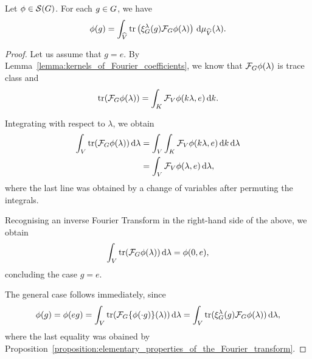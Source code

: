 \begin{proposition}
\label{proposition:inverse_Fourier_Transform}
    Let $\phi \in \Schwartz{\Group}$.
    For each $g \in \Group$,
    we have
    \begin{align*}
        \phi(g)
        = \int_\dualGroup{\VectorSpace}
        \tr \left( \Rep{\lambda}(g) \Fourier \phi(\lambda) \right) \dd \Plancherel{\VectorSpace}(\lambda).
    \end{align*}
\end{proposition}
\begin{proof}
    Let us assume that $g = e$.
    By Lemma~\ref{lemma:kernels_of_Fourier_coefficients}, we know that $\Fourier \phi(\lambda)$ is trace class and
    \begin{align*}
        \tr(\Fourier \phi(\lambda))
        = \int_\CompactGroup \Fourier[\VectorSpace] \phi(k \lambda, e) \dd k.
    \end{align*}

    Integrating with respect to $\lambda$, we obtain
    \begin{align*}
        \int_\VectorSpace \tr(\Fourier \phi(\lambda)) \dd \lambda
        &= \int_\VectorSpace \int_\CompactGroup \Fourier[\VectorSpace] \phi(k \lambda, e) \dd k \dd \lambda\\
        &= \int_\VectorSpace \Fourier[\VectorSpace] \phi(\lambda, e) \dd \lambda,
    \end{align*}
    where the last line was obtained by a change of variables after permuting the integrals.

    Recognising an inverse Fourier Transform in the right-hand side of the above, we obtain
    \begin{align*}
        \int_\VectorSpace \tr(\Fourier \phi(\lambda)) \dd \lambda
        = \phi(0, e),
    \end{align*}
    concluding the case $g = e$.

    The general case follows immediately, since
    \begin{align*}
        \phi(g) = \phi(e g) = \int_\VectorSpace \tr(\Fourier \{\phi(\dummy g)\}(\lambda)) \dd \lambda
        = \int_\VectorSpace \tr(\Rep\lambda(g) \Fourier \phi(\lambda)) \dd \lambda,
    \end{align*}
    where the last equality was obained by Proposition~\ref{proposition:elementary_properties_of_the_Fourier_transform}.
\end{proof}

